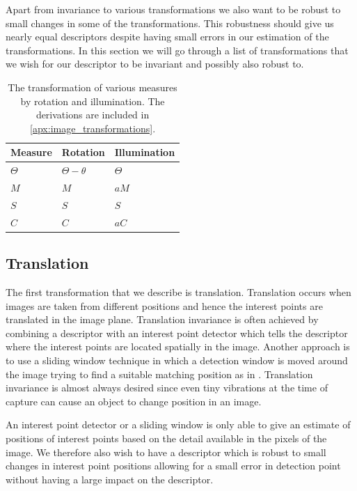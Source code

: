 \documentclass[thesis.tex]{subfiles}
\begin{document}
Apart from invariance to various transformations we also want to be robust to small changes in some of the transformations. This robustness should give us nearly equal descriptors despite having small errors in our estimation of the transformations.
In this section we will go through a list of transformations that we wish for our descriptor to be invariant and possibly also robust to.

\begin{table}[H]
	\centering
	\begin{tabular}{@{}l|ll@{}}
	Measure & Rotation & Illumination \\
	\hline
	$\Theta$ & $\Theta - \theta $ & $\Theta$ \\
	$M$ & $M$ & $a M$ \\
	$S$ & $S$ & $S$ \\
	$C$ & $C$ & $a C$ \\
	\end{tabular}
	\caption{The transformation of various measures by rotation and illumination. The derivations are included in \cref{apx:image_transformations}.}
	\label{tbl:measureInvariances}
\end{table}

\subsection{Translation}
The first transformation that we describe is translation. Translation occurs when images are taken from different positions and hence the interest points are translated in the image plane. Translation invariance is often achieved by combining a descriptor with an interest point detector which tells the descriptor where the interest points are located spatially in the image. Another approach is to use a sliding window technique in which a detection window is moved around the image trying to find a suitable matching position as in \cite{felzenszwalb2008discriminatively}. Translation invariance is almost always desired since even tiny vibrations at the time of capture can cause an object to change position in an image.

An interest point detector or a sliding window is only able to give an estimate of positions of interest points based on the detail available in the pixels of the image. We therefore also wish to have a descriptor which is robust to small changes in interest point positions allowing for a small error in detection point without having a large impact on the descriptor.
\end{document}

